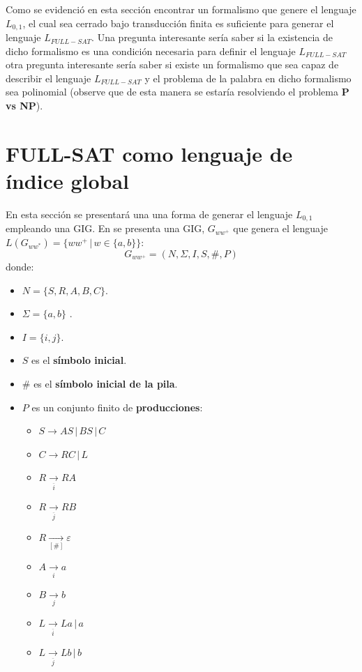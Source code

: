 Como se evidenció en esta sección encontrar un formalismo que genere el lenguaje $L_{0,1}$, el cual sea cerrado bajo transducción finita
es suficiente para generar el lenguaje $L_{FULL-SAT}$. Una pregunta interesante sería saber si la existencia de dicho formalismo
es una condición necesaria para definir el lenguaje $L_{FULL-SAT}$ otra pregunta interesante sería saber si existe un formalismo
que sea capaz de describir el lenguaje $L_{FULL-SAT}$ y el problema de la palabra en dicho formalismo sea polinomial (observe que de esta manera
se estaría resolviendo el problema \textbf{P vs NP}).

\section{FULL-SAT como lenguaje de índice global}

En esta sección se presentará una una forma de generar el lenguaje $L_{0,1}$ empleando una GIG. En \cite{globalIndexLanguages} se presenta
una GIG, $G_{ww^+}$ que genera el lenguaje $L(G_{ww^*})=\{ww^+\,|\,w\in\{a,b\}\}$: 
$$
    G_{ww^+} = (N, \Sigma, I, S, \#, P) 
$$
donde:

\begin{itemize}
    \item $N= \{S,R,A,B,C\}$.
    \item \( \Sigma=\{a,b\} \) .
    \item $I=\{i,j\}$.
    \item $S$ es el \textbf{símbolo inicial}.
    \item $\#$ es el \textbf{símbolo inicial de la pila}.
    \item $P$ es un conjunto finito de \textbf{producciones}:
          \begin{multicols}{2}
              \begin{itemize}
                  \item $S\to AS\,|\,BS\,|\,C$
                  \item $C\to RC\,|\,L$
                  \item $R\underset{\overline{i}}{\to} RA$
                  \item $R\underset{\overline{j}}{\to} RB$
                  \item $R\underset{[\#]}{\to} \varepsilon$
                  \item $A\underset{i}{\to} a$
                  \item $B\underset{j}{\to} b$
                  \item $L\underset{\overline{i}}{\to} La\,|\,a$
                  \item $L\underset{\overline{j}}{\to} Lb\,|\,b$
              \end{itemize}
          \end{multicols}
\end{itemize}

